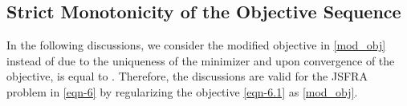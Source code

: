 
\subsection{Strict Monotonicity of the Objective Sequence} \label{mcity}
In the following discussions, we consider the modified objective  in \eqref{mod_obj} instead of  due to the uniqueness of the minimizer and upon convergence of the objective,  is equal to . Therefore, the discussions are valid for the \ac{JSFRA} problem in \eqref{eqn-6} by regularizing the objective \eqref{eqn-6.1} as \eqref{mod_obj}.

